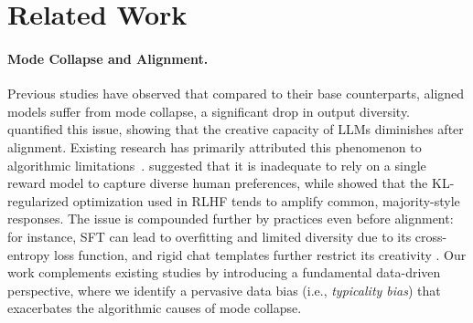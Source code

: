 \section{Related Work}\label{sec:related_work}
\paragraph{Mode Collapse and Alignment.} 


Previous studies \citep{padmakumar_does_2024, west2025basemodelsbeataligned} have observed that compared to their base counterparts, aligned models suffer from mode collapse, a significant drop in output diversity. \citet{lu2025aihumanityssalieriquantifying} quantified this issue, showing that the creative capacity of LLMs diminishes after alignment. Existing research has primarily attributed this phenomenon to algorithmic limitations~\citep{Casper2023OpenPA}. \cite{chakraborty2024maxmin} suggested that it is inadequate to rely on a single reward model to capture diverse human preferences, while \cite{xiao2024algorithmic} showed that the KL-regularized optimization used in RLHF tends to amplify common, majority-style responses. The issue is compounded further by practices even before alignment: for instance, SFT can lead to overfitting and limited diversity due to its cross-entropy loss function,  and rigid chat templates further restrict its creativity \citep{yun2025price}.  %
Our work complements existing studies by introducing a fundamental data-driven perspective, where we identify a pervasive data bias (i.e., \textit{typicality bias}) that exacerbates the algorithmic causes of mode collapse. 


